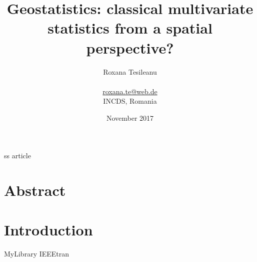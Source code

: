 ss {article}

\title {Geostatistics: classical multivariate statistics from a spatial perspective?}
\date {November 2017}

\usepackage {amsmath}
\usepackage {graphics}
\usepackage {verbatim}
\usepackage {cite}
\usepackage {booktabs}
\usepackage {float}
\usepackage [titletoc, toc, title] {appendix}
\usepackage {hyperref}
\usepackage [T1]{fontenc}

\author {Roxana Tesileanu \\
\\
\href{mailto: roxana.te@web.de}{roxana.te@web.de} \\
INCDS, Romania}


        \maketitle

\tableofcontents

\section {Abstract}

\section {Introduction}

 {MyLibrary}
 {IEEEtran}



